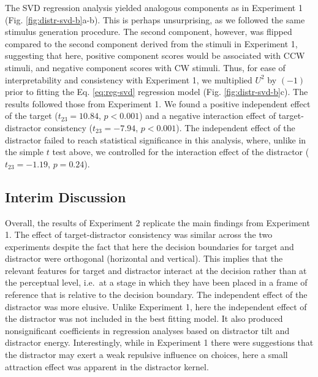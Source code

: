 \documentclass[a4paper, nobind]{templates/ociamthesis}
\begin{document}
The SVD regression analysis yielded analogous components as in Experiment 1 (Fig. \ref{fig:distr-svd-b}a-b). This is perhaps unsurprising, as we followed the same stimulus generation procedure. The second component, however, was flipped compared to the second component derived from the stimuli in Experiment 1, suggesting that here, positive component scores would be associated with CCW stimuli, and negative component scores with CW stimuli. Thus, for ease of interpretability and consistency with Experiment 1, we multiplied \(U^2\) by \((-1)\) prior to fitting the Eq. \eqref{eq:reg-svd} regression model (Fig. \ref{fig:distr-svd-b}c). The results followed those from Experiment 1. We found a positive independent effect of the target (\(t_{23}=10.84\), \(p<0.001\)) and a negative interaction effect of target-distractor consistency (\(t_{23}=-7.94\), \(p<0.001\)). The independent effect of the distractor failed to reach statistical significance in this analysis, where, unlike in the simple \(t\) test above, we controlled for the interaction effect of the distractor (\(t_{23}=-1.19\), \(p=0.24\)).

\hypertarget{interim-discussion-2}{%
\subsection{Interim Discussion}\label{interim-discussion-2}}

Overall, the results of Experiment 2 replicate the main findings from Experiment 1. The effect of target-distractor consistency was similar across the two experiments despite the fact that here the decision boundaries for target and distractor were orthogonal (horizontal and vertical). This implies that the relevant features for target and distractor interact at the decision rather than at the perceptual level, i.e.~at a stage in which they have been placed in a frame of reference that is relative to the decision boundary. The independent effect of the distractor was more elusive. Unlike Experiment 1, here the independent effect of the distractor was not included in the best fitting model. It also produced nonsignificant coefficients in regression analyses based on distractor tilt and distractor energy. Interestingly, while in Experiment 1 there were suggestions that the distractor may exert a weak repulsive influence on choices, here a small attraction effect was apparent in the distractor kernel.
\end{document}
